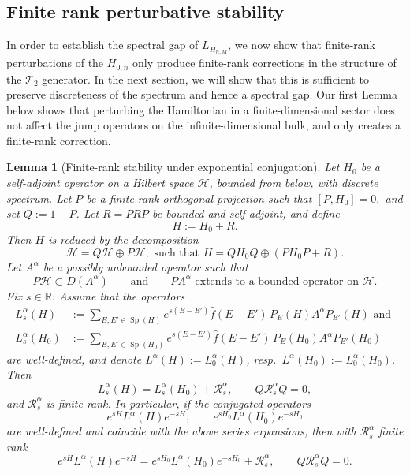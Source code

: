 \documentclass[11pt]{amsart}
\newcommand{\1}{\mathbbm{1}}
\newcommand{\spec}{\operatorname{Sp}}
\theoremstyle{plain}
\newtheorem{lemma}[theorem]{Lemma}
\theoremstyle{definition}
\theoremstyle{remark}
\numberwithin{equation}{section}
\begin{document}
\subsection{Finite rank perturbative stability}

 
\noindent In order to establish the spectral gap of $L_{H_{n,M}}$, we now show that finite-rank perturbations of the $H_{0,n}$ only produce finite-rank corrections in the structure of the $\mathscr{T}_2$ generator. In the next section, we will show that this is sufficient to preserve discreteness of the spectrum and hence a spectral gap. Our first Lemma below shows that perturbing the Hamiltonian in a finite-dimensional sector does not affect the jump operators on the infinite-dimensional bulk, and only creates a finite-rank correction.



\begin{lemma}[Finite-rank stability under exponential conjugation]
\label{lem:conjugated-L-finite-rank-remainder}
Let \(H_0\) be a self-adjoint operator on a Hilbert space \(\mathcal H\), bounded from below, with discrete spectrum. Let \(P\) be a finite-rank orthogonal projection such that $[P,H_0]=0,$
and set \(Q:=1-P\). Let \(R=PRP\) be bounded and self-adjoint, and define
\[
H:=H_0+R.
\]
Then \(H\) is reduced by the decomposition
\[
\mathcal H=Q\mathcal H\oplus P\mathcal H, \text{ such that }
H=QH_0Q\oplus (PH_0P+R).
\]
Let \(A^\alpha\) be a possibly unbounded operator such that
\[
P\mathcal H\subset D(A^\alpha)
\qquad\text{and}\qquad
PA^\alpha \text{ extends to a bounded operator on }\mathcal H.
\]
Fix \(s\in \mathbb R\). Assume that the operators
\[\begin{split}
L_s^\alpha(H)
&:=
\sum_{E,E'\in \spec(H)}
e^{s(E-E')}\widehat f(E-E')\,P_E(H)A^\alpha P_{E'}(H) \text{ and }\\
L_s^\alpha(H_0)
&:=
\sum_{E,E'\in \spec(H_0)}
e^{s(E-E')}\widehat f(E-E')\,P_E(H_0)A^\alpha P_{E'}(H_0)
\end{split}
\]
are well-defined, and denote $L^\alpha(H):=L^\alpha_0(H)$, resp.~$L^\alpha(H_0):=L^\alpha_0(H_0)$. Then
\[
L_s^\alpha(H)=L_s^\alpha(H_0)+\mathcal R_s^\alpha,
\qquad
Q\mathcal R_s^\alpha Q=0,
\]
and \(\mathcal R_s^\alpha\) is finite rank. In particular, if the conjugated operators
\[
e^{sH}L^\alpha(H)e^{-sH},
\qquad
e^{sH_0}L^\alpha(H_0)e^{-sH_0}
\]
are well-defined and coincide with the above series expansions, then with \(\mathcal R_s^\alpha\) finite rank
\[
e^{sH}L^\alpha(H)e^{-sH}
=
e^{sH_0}L^\alpha(H_0)e^{-sH_0}
+\mathcal R_s^\alpha,
\qquad
Q\mathcal R_s^\alpha Q=0.
\]

\end{lemma}
\end{document}
